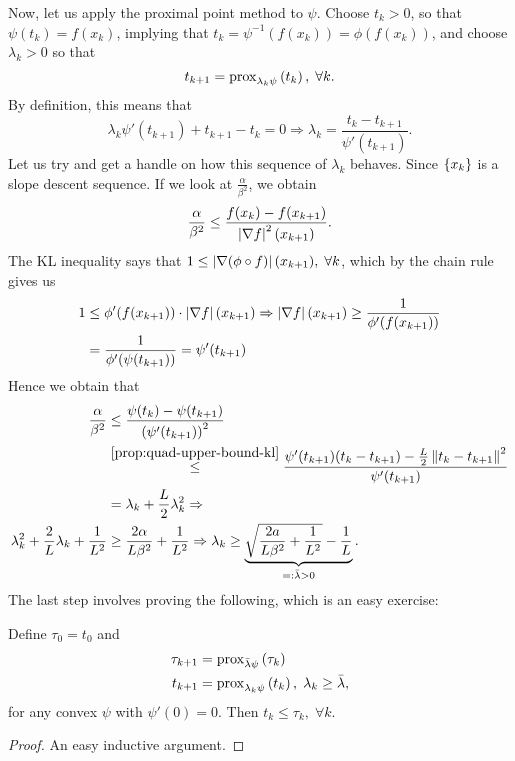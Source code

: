 Now, let us apply the proximal point method to $\psi$. Choose $t_k > 0$, so
that $\psi(t_k) = f(x_k)$, implying that $t_k = \psi^{-1}(f(x_k)) =
\phi(f(x_k))$, and choose $\lambda_k > 0$ so that
\[
	t_{k+1} = \mathrm{prox}_{\lambda_k \psi}\left( t_k \right), \; \forall k.
\]
By definition, this means that
\[
	\lambda_k \psi'(t_{k+1}) + t_{k+1} - t_k = 0 \Rightarrow
	\lambda_k = \frac{t_k - t_{k+1}}{\psi'(t_{k+1})}.
\]
Let us try and get a handle on how this sequence of $\lambda_k$ behaves. Since
$\left\{ x_k \right\}$ is a slope descent sequence. If we look at
$\frac{\alpha}{\beta^2}$, we obtain
\[
	\frac{\alpha}{\beta^2} \leq \frac{f(x_k) - f(x_{k+1})}{\left| \nabla
	f \right|^2(x_{k+1})}.
\]
The KL inequality says that $1 \leq \left| \nabla (\phi \circ f) \right|(x_{k+1}), \; \forall k$, which by the chain rule gives us
\begin{align*}
	1 & \leq \phi'(f(x_{k+1})) \cdot \left| \nabla f \right|(x_{k+1}) \Rightarrow
	\left| \nabla f \right|(x_{k+1}) \geq \frac{1}{\phi'(f(x_{k+1}))} \\
	&= \frac{1}{\phi'(\psi(t_{k+1}))} = \psi'(t_{k+1})
\end{align*}
Hence we obtain that
\begin{align*}
	\frac{\alpha}{\beta^2} &\leq \frac{\psi(t_k) - \psi(t_{k+1})}
		{\left(\psi'(t_{k+1}) \right)^2} \\
		&\overset{\cref{prop:quad-upper-bound-kl}}{\leq} \frac{\psi'(t_{k+1})(t_k - t_{k+1}) - \frac{L}{2}\norm{t_k -
		t_{k+1}}^2}{\psi'(t_{k+1})} \\
		&= \lambda_k + \frac{L}{2} \lambda_k^2 \Rightarrow \\
	\lambda_k^2 + \frac{2}{L} \lambda_k + \frac{1}{L^2} &\geq
	\frac{2\alpha}{L\beta^2} + \frac{1}{L^2} \Rightarrow
	\lambda_k \geq
	\underbrace{\sqrt{\frac{2a}{L\beta^2} + \frac{1}{L^2}} - \frac{1}{L}}_{=:
	\bar{\lambda} > 0}.
\end{align*}
The last step involves proving the following, which is an easy exercise:
\begin{exercise}{}{}
	Define $\tau_0 = t_0$ and
	\begin{align*}
		\tau_{k+1} &= \mathrm{prox}_{\bar{\lambda} \psi}\left( \tau_k \right) \\
		t_{k+1} &= \mathrm{prox}_{\lambda_k \psi}\left( t_k \right), \; \lambda_k \geq
		\bar{\lambda},
	\end{align*}
	for any convex $\psi$ with $\psi'(0) = 0$. Then $t_k \leq \tau_k, \;
	\forall k$.
	\begin{proof}
		An easy inductive argument.
	\end{proof}
\end{exercise}

